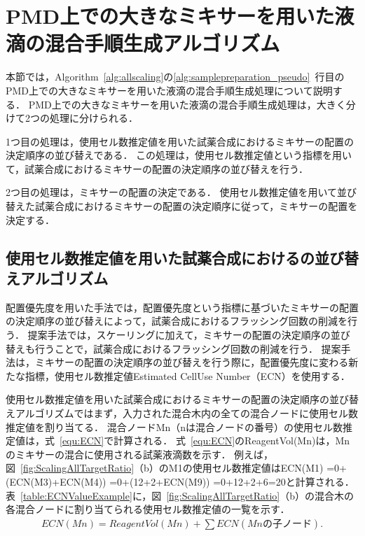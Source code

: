\section{PMD上での大きなミキサーを用いた液滴の混合手順生成アルゴリズム}\label{sec:GenerateProcedure}

本節では，Algorithm~\ref{alg:allscaling}の\ref{alg:samplepreparation_pseudo}~行目のPMD上での大きなミキサーを用いた液滴の混合手順生成処理について説明する．
PMD上での大きなミキサーを用いた液滴の混合手順生成処理は，大きく分けて2つの処理に分けられる．

1つ目の処理は，使用セル数推定値を用いた試薬合成におけるミキサーの配置の決定順序の並び替えである．
この処理は，使用セル数推定値という指標を用いて，試薬合成におけるミキサーの配置の決定順序の並び替えを行う．

2つ目の処理は，ミキサーの配置の決定である．
使用セル数推定値を用いて並び替えた試薬合成におけるミキサーの配置の決定順序に従って，ミキサーの配置を決定する．

\subsection{使用セル数推定値を用いた試薬合成におけるの並び替えアルゴリズム}\label{sec:ECN}
配置優先度を用いた手法では，配置優先度という指標に基づいたミキサーの配置の決定順序の並び替えによって，試薬合成におけるフラッシング回数の削減を行う．
提案手法では，スケーリングに加えて，ミキサーの配置の決定順序の並び替えも行うことで，試薬合成におけるフラッシング回数の削減を行う．
提案手法は，ミキサーの配置の決定順序の並び替えを行う際に，配置優先度に変わる新たな指標，使用セル数推定値Estimated CellUse Number（ECN）を使用する．

使用セル数推定値を用いた試薬合成におけるミキサーの配置の決定順序の並び替えアルゴリズムではまず，入力された混合木内の全ての混合ノードに使用セル数推定値を割り当てる．
混合ノードMn（nは混合ノードの番号）の使用セル数推定値は，式~\ref{equ:ECN}で計算される．
式~\ref{equ:ECN}のReagentVol(Mn)は，Mnのミキサーの混合に使用される試薬液滴数を示す．
例えば，図~\ref{fig:ScalingAllTargetRatio}（b）のM1の使用セル数推定値はECN(M1) =0+(ECN(M3)+ECN(M4)) =0+(12+2+ECN(M9)) =0+12+2+6=20と計算される．
表~\ref{table:ECNValueExample}に，図~\ref{fig:ScalingAllTargetRatio}（b）の混合木の各混合ノードに割り当てられる使用セル数推定値の一覧を示す．
\begin{align}
    ECN(Mn)= ReagentVol(Mn) + \sum ECN(Mnの子ノード).
\label{equ:ECN}
\end{align}

